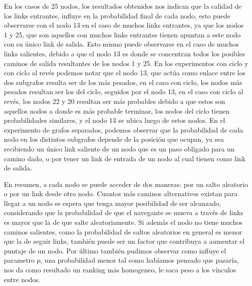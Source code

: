 En los casos de 25 nodos, los resultados obtenidos nos indican que la calidad de los links entrantes, influye en la probabilidad final de cada nodo, esto puede observarse con el nodo 13 en el caso de muchos links entrantes, ya que los nodos 1 y 25, que son aquellos con muchos links entrantes tienen apuntan a este nodo con su \'unico link de salida. Esto mismo puede observarse en el caso de muchos links salientes, debido a que el nodo 13 es donde se concentran todos los posibles caminos de salida resultantes de los nodos 1 y 25.
En los experimentos con ciclo y con ciclo al rev\'es podemos notar que el nodo 13, que act\'ua como enlace entre los dos subgrafos resulta ser de los m\'as pesados, en el caso con ciclo, los nodos m\'as pesados resultan ser los del ciclo, seguidos por el nodo 13, en el caso con ciclo al rev\'es, los nodos 22 y 20 resultan ser m\'as probables debido a que estos son aquellos nodos a donde es m\'as probable terminar, los nodos del ciclo tienen probabilidades similares, y el nodo 13 se ubica luego de estos nodos.
En el experimento de grafos separados, podemos observar que la probabilidad de cada nodo en los distintos subgrafos depende de la posici\'on que ocupan, ya sea recibiendo un \'unico link saliente de un nodo que es un paso obligado para un camino dado, o por tener un link de entrada de un nodo al cual tienen como link de salida.

En resumen, a cada nodo se puede acceder de dos maneras: por un salto aleatorio o por un link desde otro nodo. Cuantos más caminos alternativos existan para llegar a un nodo se espera que tenga mayor posibilidad de ser alcanzado, considerando que la probabilidad de que el navegante se mueva a través de links es mayor que la de que salte aleatoriamente. Si además el nodo no tiene muchos caminos salientes, como la probabilidad de saltos aleatorios en general es menor que la de seguir links, también puede ser un factor que contribuya a aumentar el puntaje de un nodo.
Por \'ultimo tambi\'en pudimos observar como influye el parametro $p$, una probabilidad menor tal como hab\'iamos pensado que pasar\'ia, nos da como resultado un ranking m\'as homogeneo, le saca peso a los v\'inculos entre nodos.